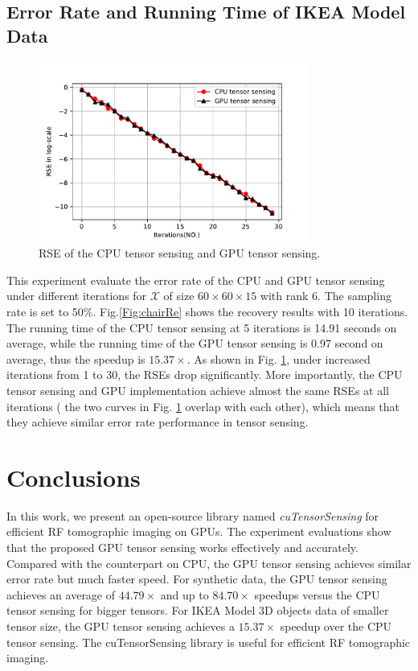 \documentclass[futureinternet,article,submit,moreauthors,pdftex,10pt,a4paper]{Definitions/mdpi}
\theoremstyle{plain}
\theoremstyle{definition}
\theoremstyle{remark}
\begin{document}
\subsection{Error Rate and Running Time of IKEA Model Data}
\begin{figure}[t]
    \centering
    \includegraphics[width=3.5in]{rse.pdf}
    \caption{RSE of the CPU tensor sensing and GPU tensor sensing.}
    \label{pic:rse}
\end{figure}

This experiment evaluate the error rate of the CPU and GPU tensor sensing under different iterations for $\mathcal{X}$ of size $60 \times 60 \times 15$ with rank 6. The sampling rate is set to 50\%. Fig.\ref{Fig:chairRe} shows the recovery results with 10 iterations. The running time of the CPU tensor sensing at 5 iterations is 14.91 seconds on average, while the running time of the GPU tensor sensing is 0.97 second on average, thus the speedup is $15.37 \times$. As shown in Fig. \ref{pic:rse}, under increased iterations from 1 to 30, the RSEs drop significantly. More importantly, the CPU tensor sensing and GPU implementation achieve almost the same RSEs at all iterations ( the two curves in Fig. \ref{pic:rse} overlap with each other), which means that they achieve similar error rate performance in tensor sensing.

\section{Conclusions}
\label{SEC_CON}
In this work, we present an open-source library named \textit{cuTensorSensing} for efficient RF tomographic imaging on GPUs. The experiment evaluations show that the proposed GPU tensor sensing works effectively and accurately. Compared with the counterpart on CPU, the GPU tensor sensing achieves similar error rate but much faster speed. For synthetic data, the GPU tensor sensing achieves an average of $44.79 \times$ and up to $84.70 \times$ speedups versus the CPU tensor sensing for bigger tensors. For IKEA Model 3D objects data of smaller tensor size, the GPU tensor sensing achieves a $15.37 \times$ speedup over the CPU tensor sensing. The cuTensorSensing library is useful for efficient RF tomographic imaging.
\end{document}
